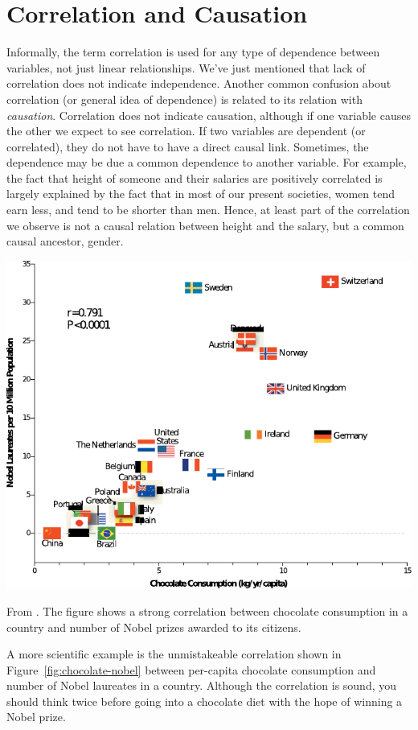 \section{Correlation and Causation}
Informally,
the term correlation is used for any type of dependence between variables,
not just linear relationships.
We've just mentioned that lack of correlation does not indicate independence.
Another common confusion about correlation
(or general idea of dependence) is
related to its relation with \emph{causation}.
Correlation does not indicate causation,
although if one variable causes the other we expect to see correlation.
If two variables are dependent (or correlated),
they do not have to have a direct causal link.
Sometimes,
the dependence may be due a common dependence to another variable.
For example,
the fact that height of someone and their salaries are positively correlated
is largely explained by the fact that in most of our present societies,
women tend earn less, and tend to be shorter than men.
Hence,
at least part of the correlation we observe is not a causal relation 
between height and the salary,
but a common causal ancestor, gender.
\begin{marginfigure}
  \includegraphics[width=\linewidth]{figures/chocolate-nobel}
  \caption{\label{fig:chocolate-nobel}
    From \parencite{messerli2012}.
    The figure shows a strong correlation between chocolate consumption
    in a country and number of Nobel prizes awarded to its citizens.
  }
\end{marginfigure}
A more scientific example is the unmistakeable correlation
shown in Figure~\ref{fig:chocolate-nobel}
between per-capita chocolate consumption
and number of Nobel laureates in a country.
Although the correlation is sound,
you should think twice before going into a chocolate diet
with the hope of winning a Nobel prize.

